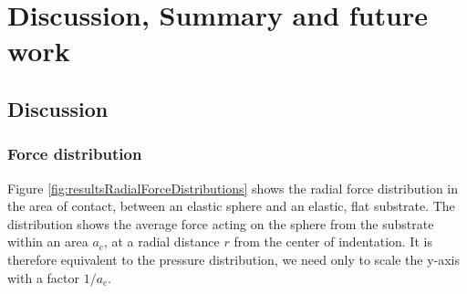 \documentclass[twoside,english]{uiofysmaster}
\begin{document}
\chapter{Discussion, Summary and future work}
\section{Discussion}\label{chap:discussion}

\subsection{Force distribution}
Figure \ref{fig:resultsRadialForceDistributions} shows the radial force distribution in the area of contact, between an elastic sphere and an elastic, flat substrate. 
The distribution shows the average force acting on the sphere from the substrate within an area $a_c$, at a radial distance $r$ from the center of indentation.
It is therefore equivalent to the pressure distribution, we need only to scale the y-axis with a factor $1/a_c$.  
\end{document}
